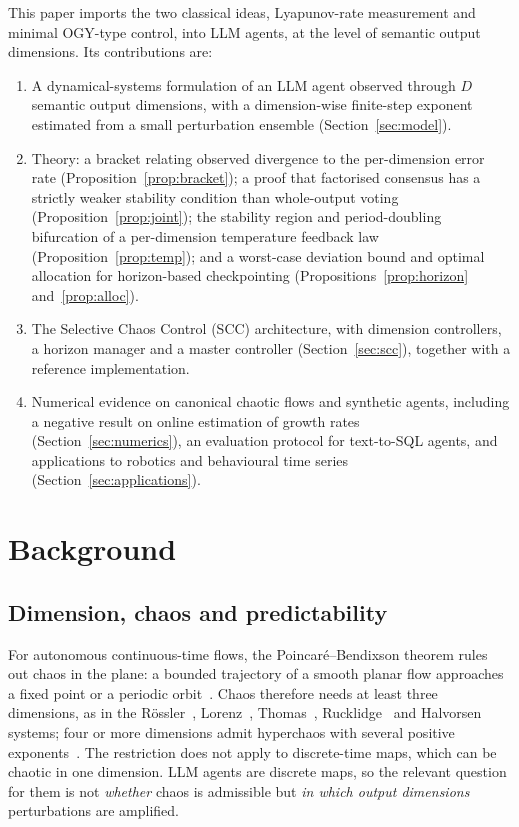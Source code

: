 \documentclass[preprint,12pt]{elsarticle}
\begin{document}
This paper imports the two classical ideas, Lyapunov-rate measurement and minimal OGY-type control, into LLM agents, at the level of semantic output dimensions. Its contributions are:
\begin{enumerate}
\item A dynamical-systems formulation of an LLM agent observed through $D$ semantic output dimensions, with a dimension-wise finite-step exponent estimated from a small perturbation ensemble (Section~\ref{sec:model}).
\item Theory: a bracket relating observed divergence to the per-dimension error rate (Proposition~\ref{prop:bracket}); a proof that factorised consensus has a strictly weaker stability condition than whole-output voting (Proposition~\ref{prop:joint}); the stability region and period-doubling bifurcation of a per-dimension temperature feedback law (Proposition~\ref{prop:temp}); and a worst-case deviation bound and optimal allocation for horizon-based checkpointing (Propositions~\ref{prop:horizon} and~\ref{prop:alloc}).
\item The Selective Chaos Control (SCC) architecture, with dimension controllers, a horizon manager and a master controller (Section~\ref{sec:scc}), together with a reference implementation.
\item Numerical evidence on canonical chaotic flows and synthetic agents, including a negative result on online estimation of growth rates (Section~\ref{sec:numerics}), an evaluation protocol for text-to-SQL agents, and applications to robotics and behavioural time series (Section~\ref{sec:applications}).
\end{enumerate}

\section{Background}
\label{sec:background}

\subsection{Dimension, chaos and predictability}
For autonomous continuous-time flows, the Poincar\'e--Bendixson theorem rules out chaos in the plane: a bounded trajectory of a smooth planar flow approaches a fixed point or a periodic orbit~\cite{strogatz2015,perko2001}. Chaos therefore needs at least three dimensions, as in the R\"ossler~\cite{rossler1976}, Lorenz~\cite{lorenz1963}, Thomas~\cite{thomas1999}, Rucklidge~\cite{rucklidge1992} and Halvorsen~\cite{sprott2010} systems; four or more dimensions admit hyperchaos with several positive exponents~\cite{rossler1979}. The restriction does not apply to discrete-time maps, which can be chaotic in one dimension. LLM agents are discrete maps, so the relevant question for them is not \emph{whether} chaos is admissible but \emph{in which output dimensions} perturbations are amplified.
\end{document}
